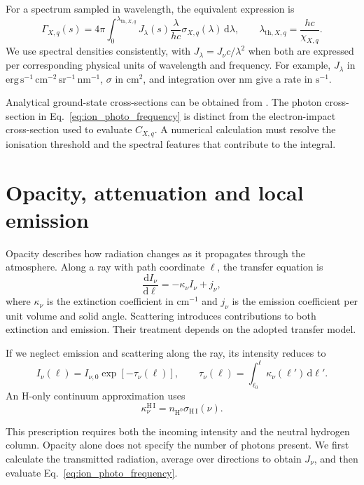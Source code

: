 \documentclass[a4paper,10pt,twoside,openany]{book}
\newcommand{\ChapColor}{Cap1Blue}
\newenvironment{lesson}[1]{%
  \begin{tcolorbox}[notebox,colback=white,colframe=\ChapColor,
    colbacktitle=\ChapColor,coltitle=white,
    title={#1}]}{\end{tcolorbox}}
\begin{document}
For a spectrum sampled in wavelength, the equivalent expression is
\begin{equation}
 \Gamma_{X,q}(s)
 =4\pi\int_0^{\lambda_{\mathrm{th},X,q}}
 J_\lambda(s)\frac{\lambda}{hc}
 \sigma_{X,q}(\lambda)\,\mathrm d\lambda,
 \qquad
 \lambda_{\mathrm{th},X,q}=\frac{hc}{\chi_{X,q}}.
 \label{eq:ion_photo_wavelength}
\end{equation}
We use spectral densities consistently, with
\(J_\lambda=J_\nu c/\lambda^2\) when both are expressed per corresponding
physical units of wavelength and frequency. For example,
\(J_\lambda\) in
\(\mathrm{erg\,s^{-1}\,cm^{-2}\,sr^{-1}\,nm^{-1}}\),
\(\sigma\) in \(\mathrm{cm^2}\), and integration over nm give a rate in
\(\mathrm{s^{-1}}\).

Analytical ground-state cross-sections can be obtained from
\cite{verner1996}. The photon cross-section in
Eq.~\eqref{eq:ion_photo_frequency} is distinct from the electron-impact
cross-section used to evaluate \(C_{X,q}\). A numerical calculation must
resolve the ionisation threshold and the spectral features that contribute
to the integral.

\section{Opacity, attenuation and local emission}
\label{subsec:ion_radiative_transfer}

Opacity describes how radiation changes as it propagates through the
atmosphere. Along a ray with path coordinate \(\ell\), the transfer equation is
\begin{equation}
 \frac{\mathrm d I_\nu}{\mathrm d\ell}
 =-\kappa_\nu I_\nu+j_\nu,
 \label{eq:ion_transfer}
\end{equation}
where \(\kappa_\nu\) is the extinction coefficient in
\(\mathrm{cm^{-1}}\) and \(j_\nu\) is the emission coefficient per unit volume
and solid angle. Scattering introduces contributions to both extinction and
emission. Their treatment depends on the adopted transfer model.

If we neglect emission and scattering along the ray, its intensity reduces to
\begin{equation}
 I_\nu(\ell)=I_{\nu,0}\exp[-\tau_\nu(\ell)],
 \qquad
 \tau_\nu(\ell)=\int_{\ell_0}^{\ell}\kappa_\nu(\ell')\,\mathrm d\ell'.
 \label{eq:ion_attenuation}
\end{equation}
An H-only continuum approximation uses
\begin{equation}
 \kappa_\nu^{\mathrm{H\,I}}
 =n_{\mathrm{H^0}}\sigma_{\mathrm{H\,I}}(\nu).
 \label{eq:ion_h_opacity}
\end{equation}
\begin{lesson}{From opacity to the photoionisation rate}
This prescription requires both the incoming intensity and the neutral
hydrogen column. Opacity alone does not specify the number of photons present.
We first calculate the transmitted radiation, average over directions to
obtain \(J_\nu\), and then evaluate
Eq.~\eqref{eq:ion_photo_frequency}.
\end{lesson}
\end{document}
